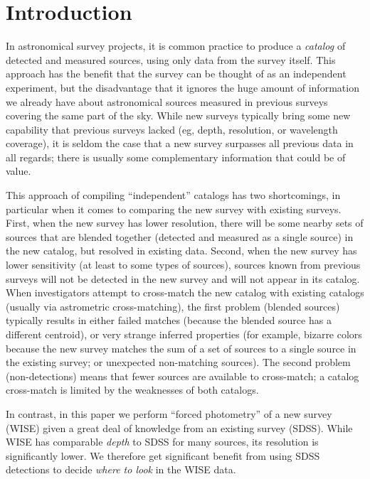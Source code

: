 \documentclass[12pt,preprint]{aastex}
\begin{document}
\section{Introduction}

In astronomical survey projects, it is common practice to produce a
\emph{catalog} of detected and measured sources, using only data from
the survey itself.  This approach has the benefit that the survey can
be thought of as an independent experiment, but the disadvantage that
it ignores the huge amount of information we already have about
astronomical sources measured in previous surveys covering the same
part of the sky.  While new surveys typically bring some new
capability that previous surveys lacked (eg, depth, resolution, or
wavelength coverage), it is seldom the case that a new survey
surpasses all previous data in all regards; there is usually some
complementary information that could be of value.

This approach of compiling ``independent'' catalogs has two
shortcomings, in particular when it comes to comparing the new survey
with existing surveys.  First, when the new survey has lower
resolution, there will be some nearby sets of sources that are blended
together (detected and measured as a single source) in the new
catalog, but resolved in existing data.  Second, when the new survey
has lower sensitivity (at least to some types of sources), sources
known from previous surveys will not be detected in the new survey and
will not appear in its catalog.  When investigators attempt to
cross-match the new catalog with existing catalogs (usually via
astrometric cross-matching), the first problem (blended sources)
typically results in either failed matches (because the blended source
has a different centroid), or very strange inferred properties (for
example, bizarre colors because the new survey matches the sum of a
set of sources to a single source in the existing survey; or
unexpected non-matching sources).  The second problem (non-detections)
means that fewer sources are available to cross-match; a catalog
cross-match is limited by the weaknesses of both catalogs.


In contrast, in this paper we perform ``forced photometry'' of a new
survey (WISE) given a great deal of knowledge from an existing survey
(SDSS).  While WISE has comparable \emph{depth} to SDSS for many
sources, its resolution is significantly lower.  We therefore get
significant benefit from using SDSS detections to decide \emph{where
  to look} in the WISE data.
\end{document}
